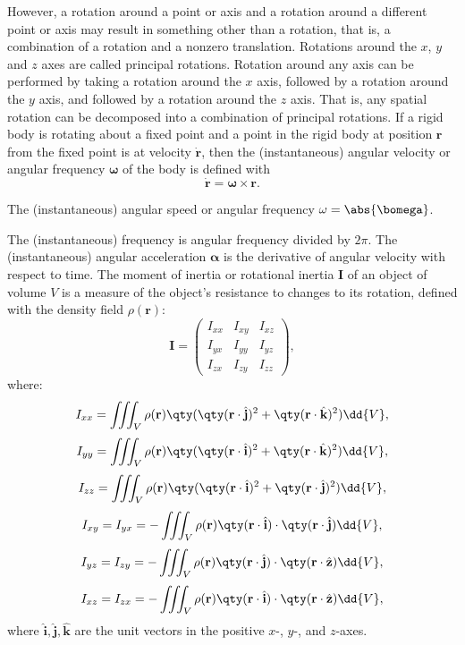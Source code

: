 \documentclass[a4paper,12pt]{article}
\begin{document}
However, a rotation around a point or axis and a rotation around a different point or axis may result in something other than a rotation, that is, a  combination of a rotation and a nonzero translation.
Rotations around the $x$, $y$ and $z$ axes are called principal rotations. Rotation around any axis can be performed by taking a rotation around the $x$ axis, followed by a rotation around the $y$ axis, and followed by a rotation around the $z$ axis. That is, any spatial rotation can be decomposed into a combination of principal rotations.
If a rigid body is rotating about a fixed point and a point in the rigid body at position $\mathbf{r}$ from the fixed point is at velocity $\dot{\mathbf{r}}$, then the (instantaneous) angular velocity or angular frequency $\boldsymbol{\omega}$ of the body is defined with
\[\dot{\mathbf{r}}=\boldsymbol{\omega}\times\mathbf{r}.\]

The (instantaneous) angular speed or angular frequency $\omega=\abs{\bomega}$.

The (instantaneous) frequency is angular frequency divided by $2\pi$.
The (instantaneous) angular acceleration $\boldsymbol{\alpha}$ is the derivative of angular velocity with respect to time.
The moment of inertia or rotational inertia $\mathbf{I}$ of an object of volume $V$ is a measure of the object's resistance to changes to its rotation, defined with the density field $\rho(\mathbf{r})$:
\[\mathbf{I}=\begin{pmatrix}
    I_{xx} & I_{xy} & I_{xz}\\
    I_{yx} & I_{yy} & I_{yz}\\
    I_{zx} & I_{zy} & I_{zz}
\end{pmatrix},\]
where:
\[I_{xx}=\iiint_V\rho(\mathbf{r})\qty(\qty(\mathbf{r}\cdot\hat{\mathbf{j}})^2+\qty(\mathbf{r}\cdot\hat{\mathbf{k}})^2)\dd{V},\]
\[I_{yy}=\iiint_V\rho(\mathbf{r})\qty(\qty(\mathbf{r}\cdot\hat{\mathbf{i}})^2+\qty(\mathbf{r}\cdot\hat{\mathbf{k}})^2)\dd{V},\]
\[I_{zz}=\iiint_V\rho(\mathbf{r})\qty(\qty(\mathbf{r}\cdot\hat{\mathbf{i}})^2+\qty(\mathbf{r}\cdot\hat{\mathbf{j}})^2)\dd{V},\]
\[I_{xy}=I_{yx}=-\iiint_V\rho(\mathbf{r})\qty(\mathbf{r}\cdot\hat{\mathbf{i}})\cdot\qty(\mathbf{r}\cdot\hat{\mathbf{j}})\dd{V},\]
\[I_{yz}=I_{zy}=-\iiint_V\rho(\mathbf{r})\qty(\mathbf{r}\cdot\hat{\mathbf{j}})\cdot\qty(\mathbf{r}\cdot\hat{\mathbf{z}})\dd{V},\]
\[I_{xz}=I_{zx}=-\iiint_V\rho(\mathbf{r})\qty(\mathbf{r}\cdot\hat{\mathbf{i}})\cdot\qty(\mathbf{r}\cdot\hat{\mathbf{z}})\dd{V},\]
where $\hat{\mathbf{i}},\hat{\mathbf{j}},\hat{\mathbf{k}}$ are the unit vectors in the positive $x$-, $y$-, and $z$-axes.
\end{document}
